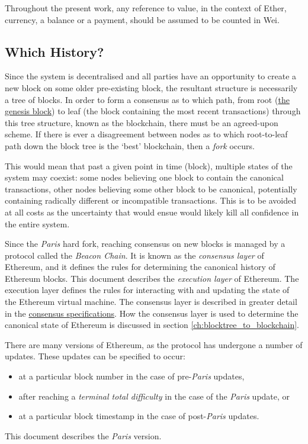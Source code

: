 \documentclass[9pt,oneside]{amsart}
\begin{document}
\begin{multicols}{2}
Throughout the present work, any reference to value, in the context of Ether, currency, a balance or a payment, should be assumed to be counted in Wei.

\subsection{Which History?}

Since the system is decentralised and all parties have an opportunity to create a new block on some older pre-existing block, the resultant structure is necessarily a tree of blocks. In order to form a consensus as to which path, from root (\hyperlink{Genesis_Block}{the genesis block}) to leaf (the block containing the most recent transactions) through this tree structure, known as the blockchain, there must be an agreed-upon scheme. If there is ever a disagreement between nodes as to which root-to-leaf path down the block tree is the `best' blockchain, then a \textit{fork} occurs.

This would mean that past a given point in time (block), multiple states of the system may coexist: some nodes believing one block to contain the canonical transactions, other nodes believing some other block to be canonical, potentially containing radically different or incompatible transactions. This is to be avoided at all costs as the uncertainty that would ensue would likely kill all confidence in the entire system.

Since the \textit{Paris} hard fork, reaching consensus on new blocks is managed by a protocol called the \textit{Beacon Chain}.
It is known as the \textit{consensus layer} of Ethereum, and it defines the rules for determining the canonical history of Ethereum blocks.
This document describes the \textit{execution layer} of Ethereum.
The execution layer defines the rules for interacting with and updating the state of the Ethereum virtual machine.
The consensus layer is described in greater detail in the \href{https://github.com/ethereum/consensus-specs}{consensus specifications}.
How the consensus layer is used to determine the canonical state of Ethereum is discussed in section \ref{ch:blocktree_to_blockchain}.

There are many versions of Ethereum, as the protocol has undergone a number of updates.
These updates can be specified to occur:
\begin{itemize}
  \item at a particular block number in the case of pre-\textit{Paris} updates,
  \item after reaching a \textit{terminal total difficulty} in the case of the \textit{Paris} update, or
  \item at a particular block timestamp in the case of post-\textit{Paris} updates.
\end{itemize}
This document describes the \textit{Paris} version.


\end{multicols}
\end{document}
